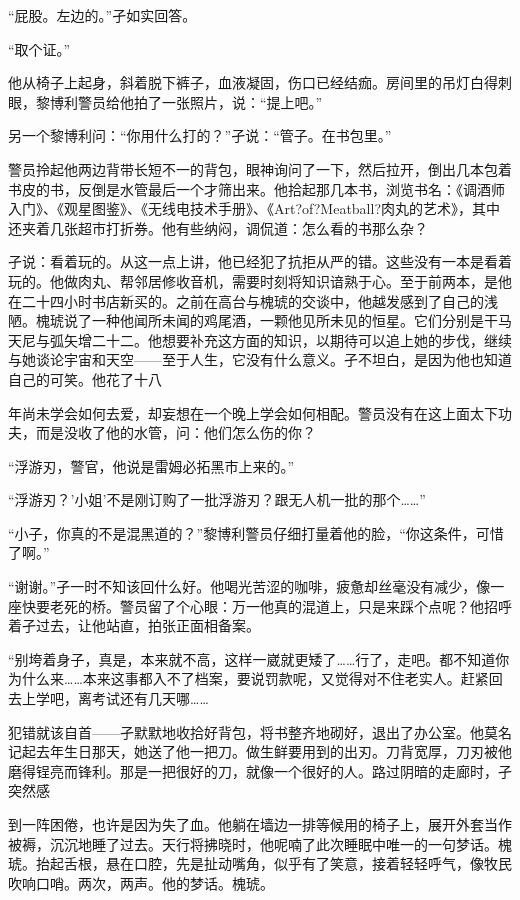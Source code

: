 \documentclass{article}
\begin{document}
“屁股。左边的。”孑如实回答。

\newpage 



“取个证。”

他从椅子上起身，斜着脱下裤子，血液凝固，伤口已经结痂。房间里的吊灯白得刺眼，黎博利警员给他拍了一张照片，说：“提上吧。”

另一个黎博利问：“你用什么打的？”孑说：“管子。在书包里。”

警员拎起他两边背带长短不一的背包，眼神询问了一下，然后拉开，倒出几本包着书皮的书，反倒是水管最后一个才筛出来。他拾起那几本书，浏览书名：《调酒师入门》、《观星图鉴》、《无线电技术手册》、《Art?of?Meatball?肉丸的艺术》，其中还夹着几张超市打折券。他有些纳闷，调侃道：怎么看的书那么杂？

孑说：看着玩的。从这一点上讲，他已经犯了抗拒从严的错。这些没有一本是看着玩的。他做肉丸、帮邻居修收音机，需要时刻将知识谙熟于心。至于前两本，是他在二十四小时书店新买的。之前在高台与槐琥的交谈中，他越发感到了自己的浅陋。槐琥说了一种他闻所未闻的鸡尾酒，一颗他见所未见的恒星。它们分别是干马天尼与弧矢增二十二。他想要补充这方面的知识，以期待可以追上她的步伐，继续与她谈论宇宙和天空——至于人生，它没有什么意义。孑不坦白，是因为他也知道自己的可笑。他花了十八

\newpage 

年尚未学会如何去爱，却妄想在一个晚上学会如何相配。警员没有在这上面太下功夫，而是没收了他的水管，问：他们怎么伤的你？

“浮游刃，警官，他说是雷姆必拓黑市上来的。”

“浮游刃？’小姐’不是刚订购了一批浮游刃？跟无人机一批的那个……”

“小子，你真的不是混黑道的？”黎博利警员仔细打量着他的脸，“你这条件，可惜了啊。”

“谢谢。”孑一时不知该回什么好。他喝光苦涩的咖啡，疲惫却丝毫没有减少，像一座快要老死的桥。警员留了个心眼：万一他真的混道上，只是来踩个点呢？他招呼着孑过去，让他站直，拍张正面相备案。

“别垮着身子，真是，本来就不高，这样一崴就更矮了……行了，走吧。都不知道你为什么来……本来这事都入不了档案，要说罚款呢，又觉得对不住老实人。赶紧回去上学吧，离考试还有几天哪……

犯错就该自首——孑默默地收拾好背包，将书整齐地砌好，退出了办公室。他莫名记起去年生日那天，她送了他一把刀。做生鲜要用到的出刃。刀背宽厚，刀刃被他磨得锃亮而锋利。那是一把很好的刀，就像一个很好的人。路过阴暗的走廊时，孑突然感

\newpage 

到一阵困倦，也许是因为失了血。他躺在墙边一排等候用的椅子上，展开外套当作被褥，沉沉地睡了过去。天行将拂晓时，他呢喃了此次睡眠中唯一的一句梦话。槐琥。抬起舌根，悬在口腔，先是扯动嘴角，似乎有了笑意，接着轻轻呼气，像牧民吹响口哨。两次，两声。他的梦话。槐琥。
\end{document}
